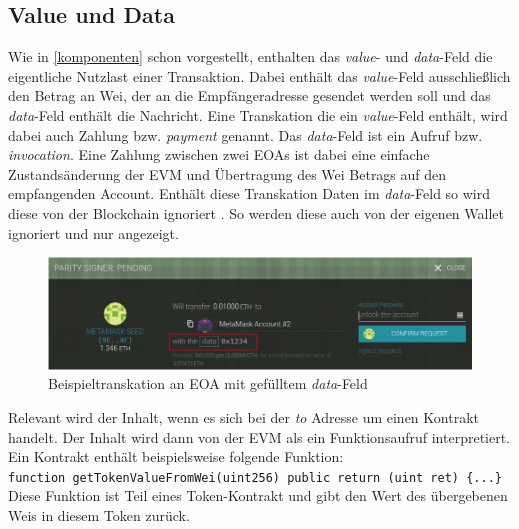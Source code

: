 \documentclass[runningheads]{llncs}
\begin{document}
\subsection{Value und Data}
Wie in \ref{komponenten} schon vorgestellt, enthalten das \textit{value}- und \textit{data}-Feld die eigentliche Nutzlast einer Transaktion. Dabei enthält das \textit{value}-Feld ausschließlich den Betrag an Wei, der an die Empfängeradresse gesendet werden soll und das \textit{data}-Feld enthält die Nachricht. 
Eine Transkation die ein \textit{value}-Feld enthält, wird dabei auch Zahlung bzw. \textit{payment} genannt. Das \textit{data}-Feld ist ein Aufruf bzw. \textit{invocation}\cite[S.108]{antonopoulos_mastering_2019}. Eine Zahlung zwischen zwei EOAs ist dabei eine einfache Zustandsänderung der EVM und Übertragung des Wei Betrags auf den empfangenden Account. Enthält diese Transkation Daten im \textit{data}-Feld so wird diese von der Blockchain ignoriert \cite[S.10]{wood_ethereum/yellowpaper_2019}. So werden diese auch von der eigenen Wallet ignoriert und nur angezeigt.
\begin{figure}
  \includegraphics[width=\textwidth, keepaspectratio]{dataTransaction.png}
  \caption{Beispieltranskation an EOA mit gefülltem \textit{data}-Feld \cite[S.109]{antonopoulos_mastering_2019}}
\end{figure}
Relevant wird der Inhalt, wenn es sich bei der \textit{to} Adresse um einen Kontrakt handelt. Der Inhalt wird dann von der EVM als ein Funktionsaufruf interpretiert. Ein Kontrakt enthält beispielsweise folgende Funktion:\\ 
\texttt{function getTokenValueFromWei(uint256) public return (uint ret) \{...\}}
Diese Funktion ist Teil eines Token-Kontrakt und gibt den Wert des übergebenen Weis in diesem Token zurück.
\end{document}

